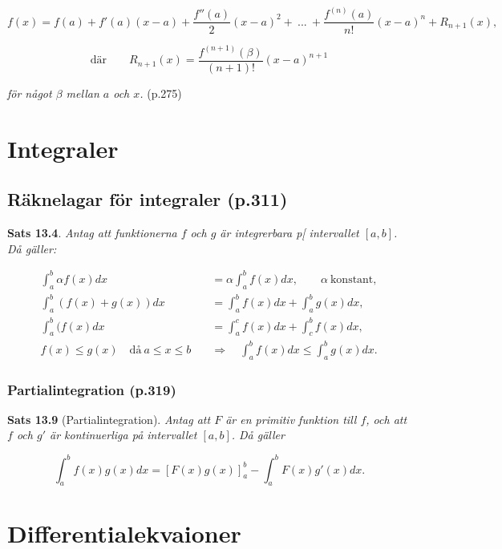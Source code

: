 \documentclass[11pt]{article}
\begin{document}
\begin{equation}
    f(x) = f(a) + f'(a)(x - a) + \frac{f''(a)}{2}(x - a)^2 +\ ...\ + \frac{f^{(n)}(a)}{n!}(x - a)^n + R_{n + 1}(x),
\end{equation}

\begin{equation}
    \text{där}\qquad R_{n + 1}(x) = \frac{f^{(n + 1)}(\beta)}{(n + 1)!}(x - a)^{n + 1}
\end{equation}

\textit{för något $\beta$ mellan $a$ och $x$.} (p.275)

\newpage
\section{Integraler}

\subsection{Räknelagar för integraler (p.311)}

\textbf{Sats 13.4}. \textit{Antag att funktionerna $f$ och $g$ är integrerbara p[ intervallet $[a, b]$. Då gäller:}

\begin{align}
    \int_a^b{\alpha f(x)} dx &= \alpha \int_a^b{f(x)} dx, \qquad \alpha\ \text{konstant},\\
    \int_a^b{(f(x) + g(x))} dx &= \int_a^b{f(x)} dx + \int_a^b{g(x)} dx,\\
    \int_a^b{(f(x)} dx &= \int_a^c{f(x)} dx + \int_c^b{f(x)} dx,\\
    f(x) \leq g(x) \quad \text{då}\ a \leq x \leq b \quad &\Rightarrow \quad \int_a^b{f(x)} dx \leq \int_a^b{g(x)} dx.
\end{align}

\subsubsection{Partialintegration (p.319)}

\textbf{Sats 13.9} (Partialintegration). \textit{Antag att $F$ är en primitiv funktion till $f$, och att $f$ och $g'$ är kontinuerliga på intervallet $[a, b]$. Då gäller}

\begin{equation}
    \int_a^b{f(x)g(x)}dx = \left [F(x)g(x)\right ]_a^b - \int_a^b{F(x)g'(x)}dx.
\end{equation}

\newpage
\section{Differentialekvaioner}
\end{document}
